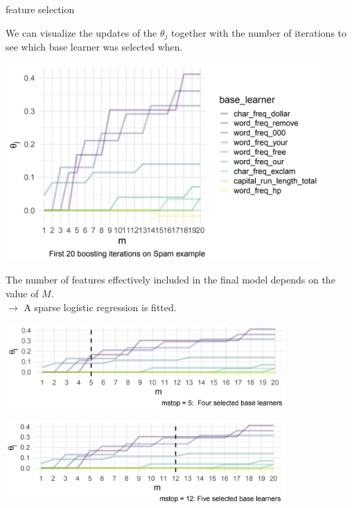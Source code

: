 
\begin{vbframe}{feature selection}

We can visualize the updates of the $\theta_j$ together with the number of 
iterations to see which base learner was selected when.

\vfill

\begin{center}
\includegraphics[width=0.9\textwidth]{figure_man/componentwise-gb.png}
\end{center}

\framebreak





The number of features effectively included in the final model depends on the 
value of $M$. \\

$\rightarrow$ A sparse logistic regression is fitted.

\vfill

\begin{center}
\includegraphics[width=0.8\textwidth]{figure_man/mstop5.png}
\end{center}

\vfill

\begin{center}
\includegraphics[width=0.8\textwidth]{figure_man/mstop12.png}
\end{center}

\end{vbframe}

